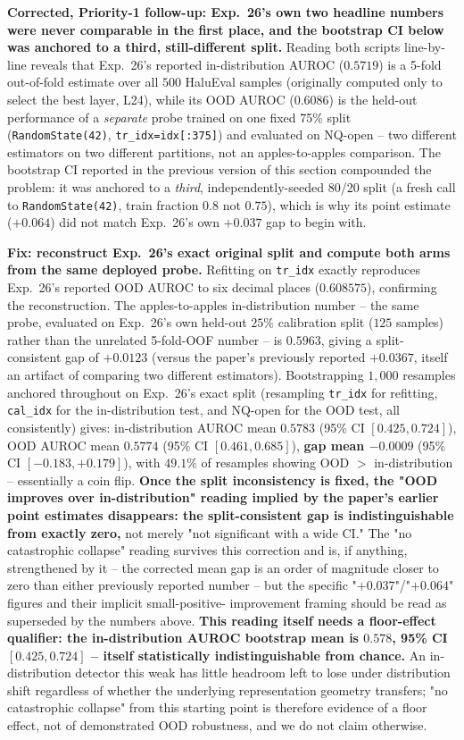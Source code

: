 \documentclass[onecolumn]{jmlr}
\begin{document}
\textbf{Corrected, Priority-1 follow-up: Exp.~26's own two headline
numbers were never comparable in the first place, and the bootstrap CI
below was anchored to a third, still-different split.} Reading both
scripts line-by-line reveals that Exp.~26's reported in-distribution
AUROC ($0.5719$) is a 5-fold out-of-fold estimate over all $500$
HaluEval samples (originally computed only to select the best layer,
L24), while its OOD AUROC ($0.6086$) is the held-out performance of a
\emph{separate} probe trained on one fixed 75\% split
(\texttt{RandomState(42)}, \texttt{tr\_idx=idx[:375]}) and evaluated
on NQ-open -- two different estimators on two different partitions,
not an apples-to-apples comparison. The bootstrap CI reported in the
previous version of this section compounded the problem: it was
anchored to a \emph{third}, independently-seeded 80/20 split (a fresh
call to \texttt{RandomState(42)}, train fraction $0.8$ not $0.75$),
which is why its point estimate ($+0.064$) did not match Exp.~26's own
$+0.037$ gap to begin with.

\textbf{Fix: reconstruct Exp.~26's exact original split and compute
both arms from the same deployed probe.} Refitting on
\texttt{tr\_idx} exactly reproduces Exp.~26's reported OOD AUROC to six
decimal places ($0.608575$), confirming the reconstruction. The
apples-to-apples in-distribution number -- the same probe, evaluated
on Exp.~26's own held-out $25\%$ calibration split ($125$ samples)
rather than the unrelated 5-fold-OOF number -- is $0.5963$, giving a
split-consistent gap of $+0.0123$ (versus the paper's previously
reported $+0.0367$, itself an artifact of comparing two different
estimators). Bootstrapping $1{,}000$ resamples anchored throughout on
Exp.~26's exact split (resampling \texttt{tr\_idx} for refitting,
\texttt{cal\_idx} for the in-distribution test, and NQ-open for the OOD
test, all consistently) gives: in-distribution AUROC mean $0.5783$
(95\% CI $[0.425,0.724]$), OOD AUROC mean $0.5774$ (95\% CI
$[0.461,0.685]$), \textbf{gap mean $-0.0009$} (95\% CI
$[-0.183,+0.179]$), with $49.1\%$ of resamples showing OOD $>$
in-distribution -- essentially a coin flip. \textbf{Once the split
inconsistency is fixed, the "OOD improves over in-distribution" reading
implied by the paper's earlier point estimates disappears: the
split-consistent gap is indistinguishable from exactly zero,} not
merely "not significant with a wide CI." The "no catastrophic collapse"
reading survives this correction and is, if anything, strengthened by
it -- the corrected mean gap is an order of magnitude closer to zero
than either previously reported number -- but the specific
"$+0.037$"/"$+0.064$" figures and their implicit small-positive-
improvement framing should be read as superseded by the numbers above.
\textbf{This reading itself needs a floor-effect qualifier: the
in-distribution AUROC bootstrap mean is $0.578$, 95\% CI
$[0.425,0.724]$ -- itself statistically indistinguishable from chance.}
An in-distribution detector this weak has little headroom left to lose
under distribution shift regardless of whether the underlying
representation geometry transfers; "no catastrophic collapse" from this
starting point is therefore evidence of a floor effect, not of
demonstrated OOD robustness, and we do not claim otherwise.
\end{document}
